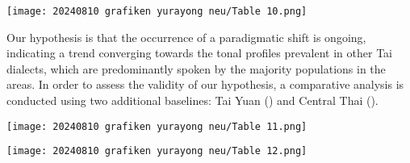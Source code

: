 \documentclass[output=paper]{langscibook}
\begin{document}
\begin{table}
\texttt{[image: 20240810 grafiken yurayong neu/Table 10.png]}
\caption{Tone paradigm of the Northern Lao dialect speaker (LN67) in Sangkhlaburi, Kanchanaburi province, Thailand.}
\label{tab:yurayong:10}
\end{table}

Our hypothesis is that the occurrence of a paradigmatic shift is ongoing, indicating a trend converging towards the tonal profiles prevalent in other Tai dialects, which are predominantly spoken by the majority populations in the areas. In order to assess the validity of our hypothesis, a comparative analysis is conducted using two additional baselines: Tai Yuan () and Central Thai ().


\begin{table}
\texttt{[image: 20240810 grafiken yurayong neu/Table 11.png]}
\caption{Tone paradigm of common Tai Yuan.}
\label{tab:yurayong:11}
\end{table}

\begin{table}
\texttt{[image: 20240810 grafiken yurayong neu/Table 12.png]}
\caption{Tone paradigm of common Central Thai.}
\label{tab:yurayong:12}
\end{table}
\end{document}

